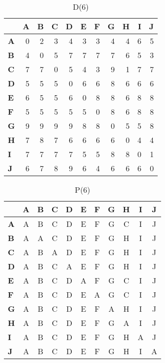 \documentclass{article}
\begin{document}
\begin{table}[H]\centering
\caption{D(6)}
\begin{tabular}{l r r r r r r r r r r}
\toprule
 & \textbf{A} & \textbf{B} & \textbf{C} & \textbf{D} & \textbf{E} & \textbf{F} & \textbf{G} & \textbf{H} & \textbf{I} & \textbf{J}\\\midrule
\textbf{A} & 0 & 2 & 3 & 4 & 3 & 3 & 4 & 4 & 6 & 5 \\
\textbf{B} & 4 & 0 & 5 & 7 & 7 & 7 & 7 & 6 & 5 & 3 \\
\textbf{C} & 7 & 7 & 0 & 5 & 4 & 3 & 9 & 1 & 7 & 7 \\
\textbf{D} & 5 & 5 & 5 & 0 & 6 & 6 & 8 & 6 & 6 & 6 \\
\textbf{E} & 6 & 5 & 5 & 6 & 0 & 8 & 8 & 6 & 8 & 8 \\
\textbf{F} & 5 & 5 & 5 & 5 & 5 & 0 & 8 & 6 & 8 & 8 \\
\textbf{G} & 9 & 9 & 9 & 9 & 8 & 8 & 0 & 5 & 5 & 8 \\
\textbf{H} & 7 & 8 & 7 & 6 & 6 & 6 & 6 & 0 & 4 & 4 \\
\textbf{I} & 7 & 7 & 7 & 7 & 5 & 5 & 8 & 8 & 0 & 1 \\
\textbf{J} & 6 & 7 & 8 & 9 & 6 & 4 & 6 & 6 & 6 & 0 \\
\bottomrule
\end{tabular}
\end{table}

\begin{table}[H]\centering
\caption{P(6)}
\begin{tabular}{l c c c c c c c c c c}
\toprule
 & \textbf{A} & \textbf{B} & \textbf{C} & \textbf{D} & \textbf{E} & \textbf{F} & \textbf{G} & \textbf{H} & \textbf{I} & \textbf{J}\\\midrule
\textbf{A} & A & B & C & D & E & F & G & C & I & J \\
\textbf{B} & A & A & C & D & E & F & G & H & I & J \\
\textbf{C} & A & B & A & D & E & F & G & H & I & J \\
\textbf{D} & A & B & C & A & E & F & G & H & I & J \\
\textbf{E} & A & B & C & D & A & F & G & C & I & J \\
\textbf{F} & A & B & C & D & E & A & G & C & I & J \\
\textbf{G} & A & B & C & D & E & F & A & H & I & J \\
\textbf{H} & A & B & C & D & E & F & G & A & I & J \\
\textbf{I} & A & B & C & D & E & F & G & H & A & J \\
\textbf{J} & A & B & C & D & E & F & G & H & I & A \\
\bottomrule
\end{tabular}
\end{table}
\end{document}
